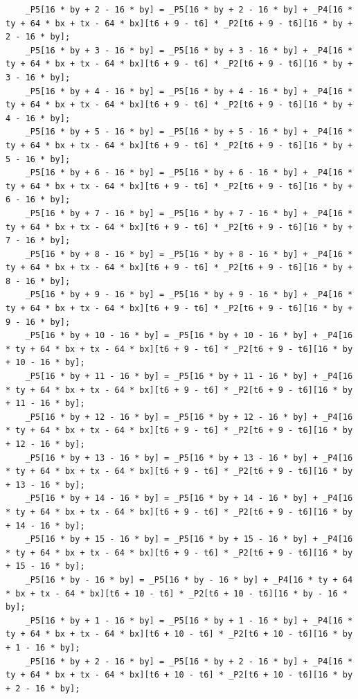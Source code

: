 \documentclass[msthesis,justified,copyright,final,numbers,sort&compress,
gsmodern,amstex,natbib]{uothesis}
\begin{document}
\begin{lstlisting}
    _P5[16 * by + 2 - 16 * by] = _P5[16 * by + 2 - 16 * by] + _P4[16 * ty + 64 * bx + tx - 64 * bx][t6 + 9 - t6] * _P2[t6 + 9 - t6][16 * by + 2 - 16 * by];
    _P5[16 * by + 3 - 16 * by] = _P5[16 * by + 3 - 16 * by] + _P4[16 * ty + 64 * bx + tx - 64 * bx][t6 + 9 - t6] * _P2[t6 + 9 - t6][16 * by + 3 - 16 * by];
    _P5[16 * by + 4 - 16 * by] = _P5[16 * by + 4 - 16 * by] + _P4[16 * ty + 64 * bx + tx - 64 * bx][t6 + 9 - t6] * _P2[t6 + 9 - t6][16 * by + 4 - 16 * by];
    _P5[16 * by + 5 - 16 * by] = _P5[16 * by + 5 - 16 * by] + _P4[16 * ty + 64 * bx + tx - 64 * bx][t6 + 9 - t6] * _P2[t6 + 9 - t6][16 * by + 5 - 16 * by];
    _P5[16 * by + 6 - 16 * by] = _P5[16 * by + 6 - 16 * by] + _P4[16 * ty + 64 * bx + tx - 64 * bx][t6 + 9 - t6] * _P2[t6 + 9 - t6][16 * by + 6 - 16 * by];
    _P5[16 * by + 7 - 16 * by] = _P5[16 * by + 7 - 16 * by] + _P4[16 * ty + 64 * bx + tx - 64 * bx][t6 + 9 - t6] * _P2[t6 + 9 - t6][16 * by + 7 - 16 * by];
    _P5[16 * by + 8 - 16 * by] = _P5[16 * by + 8 - 16 * by] + _P4[16 * ty + 64 * bx + tx - 64 * bx][t6 + 9 - t6] * _P2[t6 + 9 - t6][16 * by + 8 - 16 * by];
    _P5[16 * by + 9 - 16 * by] = _P5[16 * by + 9 - 16 * by] + _P4[16 * ty + 64 * bx + tx - 64 * bx][t6 + 9 - t6] * _P2[t6 + 9 - t6][16 * by + 9 - 16 * by];
    _P5[16 * by + 10 - 16 * by] = _P5[16 * by + 10 - 16 * by] + _P4[16 * ty + 64 * bx + tx - 64 * bx][t6 + 9 - t6] * _P2[t6 + 9 - t6][16 * by + 10 - 16 * by];
    _P5[16 * by + 11 - 16 * by] = _P5[16 * by + 11 - 16 * by] + _P4[16 * ty + 64 * bx + tx - 64 * bx][t6 + 9 - t6] * _P2[t6 + 9 - t6][16 * by + 11 - 16 * by];
    _P5[16 * by + 12 - 16 * by] = _P5[16 * by + 12 - 16 * by] + _P4[16 * ty + 64 * bx + tx - 64 * bx][t6 + 9 - t6] * _P2[t6 + 9 - t6][16 * by + 12 - 16 * by];
    _P5[16 * by + 13 - 16 * by] = _P5[16 * by + 13 - 16 * by] + _P4[16 * ty + 64 * bx + tx - 64 * bx][t6 + 9 - t6] * _P2[t6 + 9 - t6][16 * by + 13 - 16 * by];
    _P5[16 * by + 14 - 16 * by] = _P5[16 * by + 14 - 16 * by] + _P4[16 * ty + 64 * bx + tx - 64 * bx][t6 + 9 - t6] * _P2[t6 + 9 - t6][16 * by + 14 - 16 * by];
    _P5[16 * by + 15 - 16 * by] = _P5[16 * by + 15 - 16 * by] + _P4[16 * ty + 64 * bx + tx - 64 * bx][t6 + 9 - t6] * _P2[t6 + 9 - t6][16 * by + 15 - 16 * by];
    _P5[16 * by - 16 * by] = _P5[16 * by - 16 * by] + _P4[16 * ty + 64 * bx + tx - 64 * bx][t6 + 10 - t6] * _P2[t6 + 10 - t6][16 * by - 16 * by];
    _P5[16 * by + 1 - 16 * by] = _P5[16 * by + 1 - 16 * by] + _P4[16 * ty + 64 * bx + tx - 64 * bx][t6 + 10 - t6] * _P2[t6 + 10 - t6][16 * by + 1 - 16 * by];
    _P5[16 * by + 2 - 16 * by] = _P5[16 * by + 2 - 16 * by] + _P4[16 * ty + 64 * bx + tx - 64 * bx][t6 + 10 - t6] * _P2[t6 + 10 - t6][16 * by + 2 - 16 * by];

\end{lstlisting}
\end{document}
